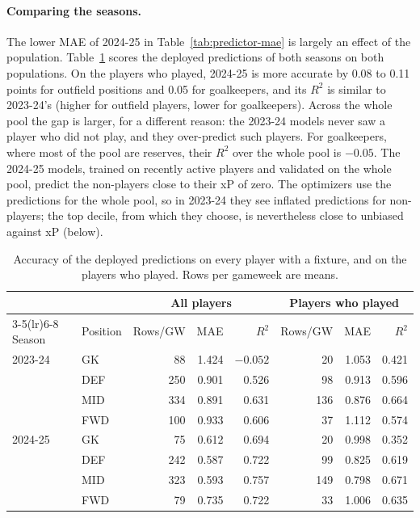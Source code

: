 \paragraph{Comparing the seasons.} The lower MAE of 2024-25 in Table~\ref{tab:predictor-mae}
is largely an effect of the population. Table~\ref{tab:predictor-pop} scores the deployed
predictions of both seasons on both populations. On the players who played, 2024-25 is more
accurate by 0.08 to 0.11 points for outfield positions and 0.05 for goalkeepers, and its $R^2$
is similar to 2023-24's (higher for outfield players, lower for goalkeepers). Across the whole
pool the gap is larger, for a different reason: the 2023-24 models never saw a player who did
not play, and they over-predict such players. For goalkeepers, where most of the pool are
reserves, their $R^2$ over the whole pool is $-0.05$. The 2024-25 models, trained on recently
active players and validated on the whole pool, predict the non-players close to their xP of
zero. The optimizers use the predictions for the whole pool, so in 2023-24 they see inflated
predictions for non-players; the top decile, from which they choose, is nevertheless close to
unbiased against xP (below).

\begin{table}[ht]
  \centering
  \caption{Accuracy of the deployed predictions on every player with a fixture, and on the
  players who played. Rows per gameweek are means.}
  \label{tab:predictor-pop}
  \small
  \begin{tabular}{llrrrrrr}
    \toprule
    & & \multicolumn{3}{c}{All players} & \multicolumn{3}{c}{Players who played} \\
    \cmidrule(lr){3-5}\cmidrule(lr){6-8}
    Season & Position & Rows/GW & MAE & $R^2$ & Rows/GW & MAE & $R^2$ \\
    \midrule
    2023-24 & GK  &  88 & 1.424 & $-0.052$ &  20 & 1.053 & 0.421 \\
            & DEF & 250 & 0.901 & 0.526    &  98 & 0.913 & 0.596 \\
            & MID & 334 & 0.891 & 0.631    & 136 & 0.876 & 0.664 \\
            & FWD & 100 & 0.933 & 0.606    &  37 & 1.112 & 0.574 \\
    \midrule
    2024-25 & GK  &  75 & 0.612 & 0.694    &  20 & 0.998 & 0.352 \\
            & DEF & 242 & 0.587 & 0.722    &  99 & 0.825 & 0.619 \\
            & MID & 323 & 0.593 & 0.757    & 149 & 0.798 & 0.671 \\
            & FWD &  79 & 0.735 & 0.722    &  33 & 1.006 & 0.635 \\
    \bottomrule
  \end{tabular}
\end{table}

